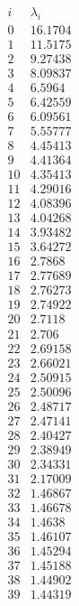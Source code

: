 \documentclass[12pt]{article}
\begin{document}
{$$
\begin{array}{|r|r|}
\hline
 i  & \lambda_i  \\
\hline
\hline
0 & 16.1704\\
\hline
1 & 11.5175\\
\hline
2 & 9.27438\\
\hline
3 & 8.09837\\
\hline
4 & 6.5964\\
\hline
5 & 6.42559\\
\hline
6 & 6.09561\\
\hline
7 & 5.55777\\
\hline
8 & 4.45413\\
\hline
9 & 4.41364\\
\hline
10 & 4.35413\\
\hline
11 & 4.29016\\
\hline
12 & 4.08396\\
\hline
13 & 4.04268\\
\hline
14 & 3.93482\\
\hline
15 & 3.64272\\
\hline
16 & 2.7868\\
\hline
17 & 2.77689\\
\hline
18 & 2.76273\\
\hline
19 & 2.74922\\
\hline
20 & 2.7118\\
\hline
21 & 2.706\\
\hline
22 & 2.69158\\
\hline
23 & 2.66021\\
\hline
24 & 2.50915\\
\hline
25 & 2.50096\\
\hline
26 & 2.48717\\
\hline
27 & 2.47141\\
\hline
28 & 2.40427\\
\hline
29 & 2.38949\\
\hline
30 & 2.34331\\
\hline
31 & 2.17009\\
\hline
32 & 1.46867\\
\hline
33 & 1.46678\\
\hline
34 & 1.4638\\
\hline
35 & 1.46107\\
\hline
36 & 1.45294\\
\hline
37 & 1.45188\\
\hline
38 & 1.44902\\
\hline
39 & 1.44319\\

\end{array}$$}
\end{document}
